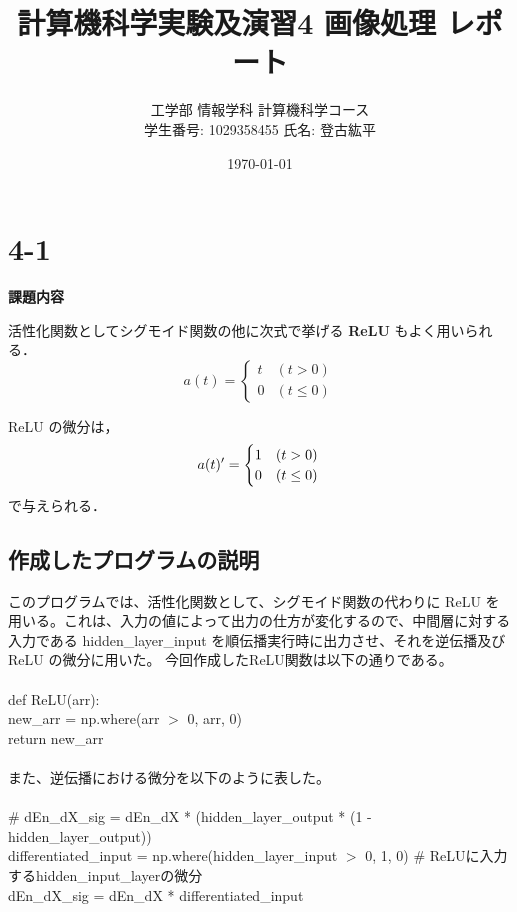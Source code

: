\documentclass[11px,a4,dvipdfmx]{jsarticle}
\begin{document}
\title{計算機科学実験及演習4 画像処理 レポート}
\author{工学部 情報学科 計算機科学コース\\学生番号: 1029358455 \hspace{1em} 氏名: 登古紘平}
\date{\today}
\maketitle
\newpage
\section{4-1}
\begin{center}
\textbf{課題内容}
\end{center}
活性化関数としてシグモイド関数の他に次式で挙げる \textbf{ReLU} もよく用いられる．\\
$$
a(t) = 
\begin{cases}
t & (t > 0) \\
0 & (t \le 0)
\end{cases}
$$

\vspace{5mm}

ReLU の微分は，\\
$$
a(t)' = 
\begin{cases}
1 & (t > 0) \\
0 & (t \le 0)
\end{cases}\\
$$
で与えられる．

\subsection{作成したプログラムの説明}
このプログラムでは、活性化関数として、シグモイド関数の代わりに ReLU を用いる。これは、入力の値によって出力の仕方が変化するので、中間層に対する入力である hidden\_layer\_input を順伝播実行時に出力させ、それを逆伝播及び ReLU の微分に用いた。
今回作成したReLU関数は以下の通りである。\\\\
def ReLU(arr):\\
    new\_arr = np.where(arr $>$ 0, arr, 0)\\
    return new\_arr\\\\
また、逆伝播における微分を以下のように表した。 \\\\
    \# dEn\_dX\_sig = dEn\_dX * (hidden\_layer\_output * (1 - hidden\_layer\_output))\\
    differentiated\_input = np.where(hidden\_layer\_input $>$ 0, 1, 0) \# ReLUに入力するhidden\_input\_layerの微分\\
    dEn\_dX\_sig = dEn\_dX * differentiated\_input
\end{document}
